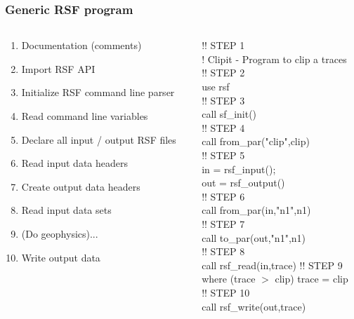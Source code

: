 \begin{frame}[ label=part1,fragile]
\frametitle{Generic RSF program}
\begin{columns}
\begin{column}{0.55\textwidth}
\begin{enumerate}
\item<1-| alert@1> Documentation (comments)
\item<1-| alert@2> Import RSF API
\item<1-| alert@3> Initialize RSF command line parser
\item <1-| alert@4>Read command line variables
\item <1-| alert@5>Declare all input / output RSF files
\item <1-| alert@6>Read input data headers
\item <1-| alert@7>Create output data headers
\item <1-| alert@8>Read input data sets
\item <1-| alert@9>(Do geophysics)...
\item <1-| alert@10>Write output data  
\end{enumerate}
\end{column}

\begin{column}{0.45\textwidth}
\color{red}
 {!! STEP 1\\! Clipit - Program to clip a traces\\}
 {!! STEP 2\\use rsf\\}
 {!! STEP 3\\call sf\_init()\\}
 {!! STEP 4\\call from\_par("clip",clip)\\}
 {!! STEP 5\\ in = rsf\_input();\\ out = rsf\_output()\\}
 {!! STEP 6\\ call from\_par(in,"n1",n1)\\}
 {!! STEP 7\\ call to\_par(out,"n1",n1)\\}
 {!! STEP 8\\ call rsf\_read(in,trace)}
 {!! STEP 9\\where (trace $>$  clip) trace =  clip\\}
 {!! STEP 10\\ call rsf\_write(out,trace)\\}
\color{black}

\end{column}
\end{columns}
\end{frame}
 


